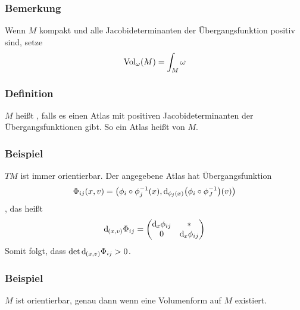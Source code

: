 \subsubsection[Bemerkung: Volumen von kompakten Mannigfaltigkeiten]{Bemerkung}
\label{ssub:1100}
Wenn $M$ kompakt und alle Jacobideterminanten der Übergangsfunktion positiv sind, setze 
\[
\operatorname{Vol}_\omega (M) = \int_M \omega
\]

\subsubsection{Definition}
\label{ssub:1101}
$M$ heißt , falls es einen Atlas mit positiven Jacobideterminanten der Übergangsfunktionen gibt. So ein Atlas heißt  von $M$.

\subsubsection{Beispiel}
\label{ssub:1102}
$TM$ ist immer orientierbar. Der angegebene Atlas hat Übergangsfunktion 
\[
\Phi_{ij} (x,v) = \enbrace*{\phi_i \circ \phi_j^{-1} (x), \mathd _{\phi_j(x)}\enbrace*{\phi_i \circ \phi_J^{-1}}(v)}
\]
, das heißt
\[
\mathrm{d}\mkern-1.0mu_{(x,v)} \Phi_{ij} = \begin{pmatrix}
\mathrm{d}\mkern-1.0mu_x \phi_{ij} & *\\
0 & \mathrm{d}\mkern-1.0mu_x \phi_{ij}
\end{pmatrix}
\]
Somit folgt, dass $\det \mathrm{d}\mkern-1.0mu_{(x,v)} \Phi_{ij} > 0$.

\subsubsection{Beispiel}
\label{ssub:1103}
$M$ ist orientierbar, genau dann wenn eine Volumenform auf $M$ existiert.






\cleardoubleoddemptypage
{}
\setcounter{page}{1}
\printindex
\listoffigures
